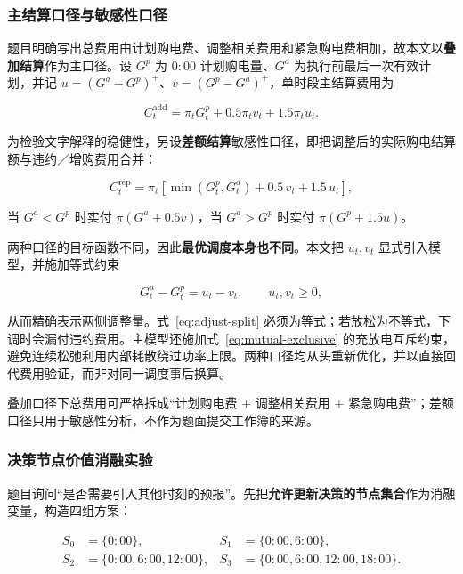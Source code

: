 \subsubsection{主结算口径与敏感性口径}
\label{sec:settlement}

题目明确写出总费用由计划购电费、调整相关费用和紧急购电费相加，故本文以\textbf{叠加结算}作为主口径。设 $G^{p}$ 为 $0{:}00$ 计划购电量、$G^{a}$ 为执行前最后一次有效计划，并记 $u=(G^{a}-G^{p})^{+}$、$v=(G^{p}-G^{a})^{+}$，单时段主结算费用为

\begin{equation}
	C^{\text{add}}_{t}=\pi_t G^{p}_{t}+0.5\pi_t v_t+1.5\pi_t u_t .
	\label{eq:settle-add}
\end{equation}

为检验文字解释的稳健性，另设\textbf{差额结算}敏感性口径，即把调整后的实际购电结算额与违约／增购费用合并：

\begin{equation}
	C^{\text{rep}}_{t}=\pi_t\left[\min(G^{p}_{t},G^{a}_{t})+0.5\,v_t+1.5\,u_t\right],
	\label{eq:settle-rep}
\end{equation}

当 $G^{a}<G^{p}$ 时实付 $\pi(G^{a}+0.5v)$，当 $G^{a}>G^{p}$ 时实付 $\pi(G^{p}+1.5u)$。

两种口径的目标函数不同，因此\textbf{最优调度本身也不同}。本文把 $u_t,v_t$ 显式引入模型，并施加等式约束

\begin{equation}
	G^{a}_{t}-G^{p}_{t}=u_t-v_t,\qquad u_t,v_t\ge 0 ,
	\label{eq:adjust-split}
\end{equation}

从而精确表示两侧调整量。式~\eqref{eq:adjust-split} 必须为等式；若放松为不等式，下调时会漏付违约费用。主模型还施加式~\eqref{eq:mutual-exclusive} 的充放电互斥约束，避免连续松弛利用内部耗散绕过功率上限。两种口径均从头重新优化，并以直接回代费用验证，而非对同一调度事后换算。

叠加口径下总费用可严格拆成“计划购电费 $+$ 调整相关费用 $+$ 紧急购电费”；差额口径只用于敏感性分析，不作为题面提交工作簿的来源。

\subsubsection{决策节点价值消融实验}

题目询问“是否需要引入其他时刻的预报”。先把\textbf{允许更新决策的节点集合}作为消融变量，构造四组方案：

\begin{equation}
	\begin{aligned}
	S_0&=\{0{:}00\}, & S_1&=\{0{:}00,6{:}00\},\\
	S_2&=\{0{:}00,6{:}00,12{:}00\}, &
	S_3&=\{0{:}00,6{:}00,12{:}00,18{:}00\}.
	\end{aligned}
	\label{eq:q3-nodes}
\end{equation}

